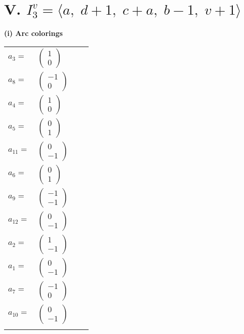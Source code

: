 \documentclass[1p]{elsarticle_modified}
\theoremstyle{definition}
\begin{document}
\centering \section*{V. $I^v_{3}= \langle a,\;d+1,\;c+a,\;b-1,\;v+1 \rangle$}
\flushleft \textbf{(i) Arc colorings}\\
\begin{tabular}{m{7pt} m{180pt} m{7pt} m{180pt} }
\flushright $a_{3}=$&$\begin{pmatrix}1\\0\end{pmatrix}$ \\
\flushright $a_{8}=$&$\begin{pmatrix}-1\\0\end{pmatrix}$ \\
\flushright $a_{4}=$&$\begin{pmatrix}1\\0\end{pmatrix}$ \\
\flushright $a_{5}=$&$\begin{pmatrix}0\\1\end{pmatrix}$ \\
\flushright $a_{11}=$&$\begin{pmatrix}0\\-1\end{pmatrix}$ \\
\flushright $a_{6}=$&$\begin{pmatrix}0\\1\end{pmatrix}$ \\
\flushright $a_{9}=$&$\begin{pmatrix}-1\\-1\end{pmatrix}$ \\
\flushright $a_{12}=$&$\begin{pmatrix}0\\-1\end{pmatrix}$ \\
\flushright $a_{2}=$&$\begin{pmatrix}1\\-1\end{pmatrix}$ \\
\flushright $a_{1}=$&$\begin{pmatrix}0\\-1\end{pmatrix}$ \\
\flushright $a_{7}=$&$\begin{pmatrix}-1\\0\end{pmatrix}$ \\
\flushright $a_{10}=$&$\begin{pmatrix}0\\-1\end{pmatrix}$\\&\end{tabular}
\end{document}
